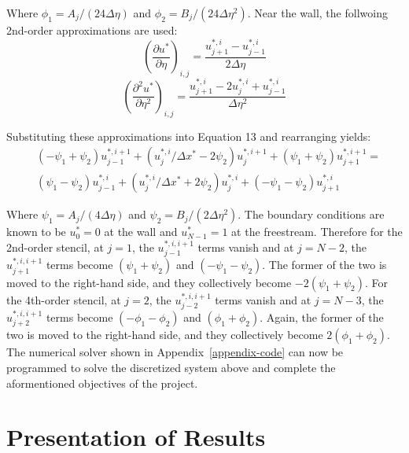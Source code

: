 \documentclass[letterpaper,12pt]{article}
\begin{document}
Where $\phi_1 = A_j/(24 \Delta \eta)$ and $\phi_2 = B_j/(24 \Delta \eta^2)$. Near the wall, the follwoing 2nd-order approximations are used:
\begin{equation}
    \left( \frac{\partial u^{*}}{\partial \eta} \right)_{i,j} = \frac{u_{j+1}^{*,i} -  u_{j-1}^{*,i}}{2 \Delta \eta}
\end{equation}
\begin{equation}
    \left( \frac{\partial^2 u^{*}}{\partial \eta^2} \right)_{i,j} = \frac{u_{j+1}^{*,i} - 2 u_{j}^{*,i} + u_{j-1}^{*,i}}{\Delta \eta^2}
\end{equation}

Substituting these approximations into Equation 13 and rearranging yields:
\begin{equation}
\begin{aligned}
    &(-\psi_1 + \psi_2)u_{j-1}^{*,i+1} + (u_{j}^{*,i} / \Delta x^* - 2 \psi_2)u_{j}^{*,i+1} + (\psi_1 + \psi_2)u_{j+1}^{*,i+1} = \\
    &(\psi_1 - \psi_2)u_{j-1}^{*,i} + (u_{j}^{*,i} / \Delta x^* + 2 \psi_2)u_{j}^{*,i} + (-\psi_1 - \psi_2)u_{j+1}^{*,i}
\end{aligned}
\end{equation}

Where $\psi_1 = A_j/(4 \Delta \eta)$ and $\psi_2 = B_j/(2 \Delta \eta^2)$. The boundary conditions are known to be $u^{*}_0=0$ at the wall and $u^{*}_{N-1}=1$ at the freestream. Therefore for the 2nd-order stencil, at $j=1$, the $u_{j-1}^{*,i,i+1}$ terms vanish and at $j=N-2$, the $u_{j+1}^{*,i,i+1}$ terms become $(\psi_1 + \psi_2)$ and $(-\psi_1 - \psi_2)$. The former of the two is moved to the right-hand side, and they collectively become $-2(\psi_1 + \psi_2)$. For the 4th-order stencil, at $j=2$, the $u_{j-2}^{*,i,i+1}$ terms vanish and at $j=N-3$, the $u_{j+2}^{*,i,i+1}$ terms become $(-\phi_1 - \phi_2)$ and $(\phi_1 + \phi_2)$. Again, the former of the two is moved to the right-hand side, and they collectively become $2(\phi_1 + \phi_2)$. The numerical solver shown in Appendix~\ref{appendix-code} can now be programmed to solve the discretized system above and complete the aformentioned objectives of the project.


\section{Presentation of Results}
\end{document}
